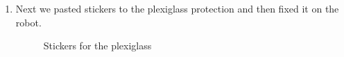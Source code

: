 \begin{enumerate}
\begin{enumerate}
		\item Next we pasted stickers to the plexiglass protection and then fixed it on the robot.
		\begin{figure}[H]
			\begin{minipage}[h]{0.47\linewidth}
			\end{minipage}
			\hfill
			\begin{minipage}[h]{0.47\linewidth}
			\end{minipage}
			\caption{Stickers for the plexiglass}
		\end{figure}
		

\end{enumerate}
\end{enumerate}
